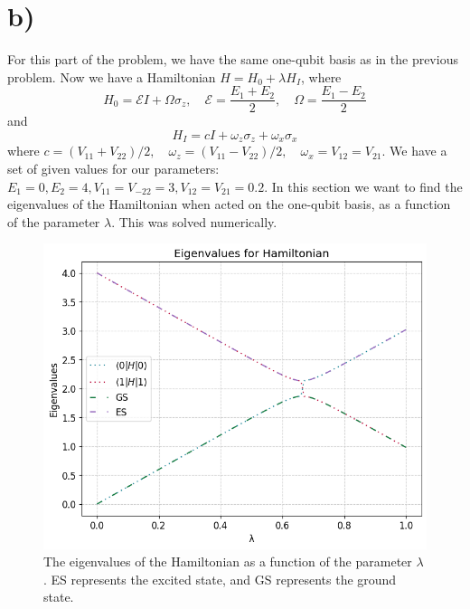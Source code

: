 \documentclass[11pt, letterpaper, titlepage]{article}
\begin{document}
\section{b)}
For this part of the problem, we have the same one-qubit basis as in the previous problem. Now we have a Hamiltonian \(H = H_0 + λH_I\), where
\[
H_0 = \mathcal{E} I + Ω σ_z, \quad \mathcal{E} = \frac{E_{1} + E_2}{2}, \quad Ω = \frac{E_1 - E_2}{2}
\]
and 
\[
H_I = cI + ω_zσ_z + ω_xσ_x
\]
where \(
c = (V_{11}+V_{22})/2, \quad ω_z = (V_{11}-V_{22})/2, \quad ω_x = V_{12}=V_{21}
\). We have a set of given values for our parameters:
\(E_1=0, E_2=4, V_{11}=V_{-22}=3, V_{12} = V_{21}=0.2\). \newline
In this section we want to find the eigenvalues of the Hamiltonian when acted on the one-qubit basis, as a function of the parameter \(λ\). This was solved numerically. 
\begin{figure}
  \begin{center}
        \includegraphics[scale=0.7]{Eigvals.png}
        \caption{The eigenvalues of the Hamiltonian as a function of the parameter \(λ\). ES represents the excited state, and GS represents the ground state.}
  \end{center}
\end{figure}
\end{document}
